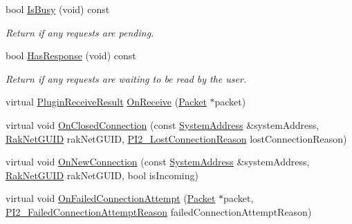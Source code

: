 \begin{DoxyCompactItemize}
\item 
\hypertarget{class_rak_net_1_1_h_t_t_p_connection2_a24b49b7b334a9ccca97b3400bd1d274f}{bool \hyperlink{class_rak_net_1_1_h_t_t_p_connection2_a24b49b7b334a9ccca97b3400bd1d274f}{Is\-Busy} (void) const }\label{class_rak_net_1_1_h_t_t_p_connection2_a24b49b7b334a9ccca97b3400bd1d274f}

\begin{DoxyCompactList}\small\item\em Return if any requests are pending. \end{DoxyCompactList}\item 
\hypertarget{class_rak_net_1_1_h_t_t_p_connection2_ac80bcebbf1bcf1af228ab8c681f323c8}{bool \hyperlink{class_rak_net_1_1_h_t_t_p_connection2_ac80bcebbf1bcf1af228ab8c681f323c8}{Has\-Response} (void) const }\label{class_rak_net_1_1_h_t_t_p_connection2_ac80bcebbf1bcf1af228ab8c681f323c8}

\begin{DoxyCompactList}\small\item\em Return if any requests are waiting to be read by the user. \end{DoxyCompactList}\item 
virtual \hyperlink{group___p_l_u_g_i_n___i_n_t_e_r_f_a_c_e___g_r_o_u_p_ga89998adaafb29e5d879113b992161085}{Plugin\-Receive\-Result} \hyperlink{class_rak_net_1_1_h_t_t_p_connection2_a3cc77b3be727d87abb8434b01a842445}{On\-Receive} (\hyperlink{struct_rak_net_1_1_packet}{Packet} $\ast$packet)
\item 
virtual void \hyperlink{class_rak_net_1_1_h_t_t_p_connection2_a12113e000659a90d54680e8c18cfc61e}{On\-Closed\-Connection} (const \hyperlink{struct_rak_net_1_1_system_address}{System\-Address} \&system\-Address, \hyperlink{struct_rak_net_1_1_rak_net_g_u_i_d}{Rak\-Net\-G\-U\-I\-D} rak\-Net\-G\-U\-I\-D, \hyperlink{group___p_l_u_g_i_n___i_n_t_e_r_f_a_c_e___g_r_o_u_p_ga376cc546fd6892c2ead48cd51796c8b8}{P\-I2\-\_\-\-Lost\-Connection\-Reason} lost\-Connection\-Reason)
\item 
virtual void \hyperlink{class_rak_net_1_1_h_t_t_p_connection2_a0326c1416cbbe7d488950a190b7e6e7f}{On\-New\-Connection} (const \hyperlink{struct_rak_net_1_1_system_address}{System\-Address} \&system\-Address, \hyperlink{struct_rak_net_1_1_rak_net_g_u_i_d}{Rak\-Net\-G\-U\-I\-D} rak\-Net\-G\-U\-I\-D, bool is\-Incoming)
\item 
virtual void \hyperlink{class_rak_net_1_1_h_t_t_p_connection2_a150039bb124bdb840dfc3aa37787a1fa}{On\-Failed\-Connection\-Attempt} (\hyperlink{struct_rak_net_1_1_packet}{Packet} $\ast$packet, \hyperlink{group___p_l_u_g_i_n___i_n_t_e_r_f_a_c_e___g_r_o_u_p_ga3e92f686bace869b78c10508c58e0825}{P\-I2\-\_\-\-Failed\-Connection\-Attempt\-Reason} failed\-Connection\-Attempt\-Reason)
\end{DoxyCompactItemize}
